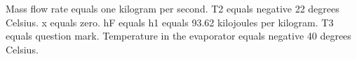 Mass flow rate equals one kilogram per second.  
T2 equals negative 22 degrees Celsius.  
x equals zero.  
hF equals h1 equals 93.62 kilojoules per kilogram.  
T3 equals question mark.  
Temperature in the evaporator equals negative 40 degrees Celsius.